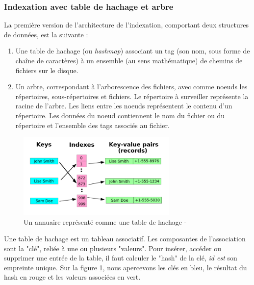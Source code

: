 \subsubsection{Indexation avec table de hachage et arbre}\label{indexation_hashmap_arbre}
La première version de l'architecture de l'indexation, comportant deux structures de données, est la suivante :
\begin{enumerate}
    \item Une table de hachage (ou \textit{hashmap}) associant un tag (son nom, sous forme de 
        chaîne de caractères) à un ensemble (au sens mathématique) de chemins de fichiers sur 
        le disque.
    \item Un arbre, correspondant à l'arborescence des fichiers, avec comme noeuds les répertoires, 
        sous-répertoires et fichiers. Le répertoire à surveiller représente la racine de l'arbre.
        Les liens entre les noeuds représentent le contenu d'un répertoire. Les données du noeud 
        contiennent le nom du fichier ou du répertoire et l'ensemble des tags associés au fichier.
\end{enumerate}
\begin{figure}
    \begin{center}
        \includegraphics[width=0.7\textwidth]{images/hashmap_wiki.png}
    \end{center}
    \caption{Un annuaire représenté comme une table de hachage - \cite{ref27}}
    \label{hashmap_wiki}
\end{figure}
Une table de hachage est un tableau associatif. Les composantes de l'association sont la "clé", 
reliée à une ou plusieurs "valeurs". Pour insérer, accéder ou supprimer une entrée de la table, 
il faut calculer le "hash" de la clé, \textit{id est} son empreinte unique. Sur la figure \ref{hashmap_wiki}, 
nous apercevons les clés en bleu, le résultat du hash en rouge et les valeurs associées en vert. 
